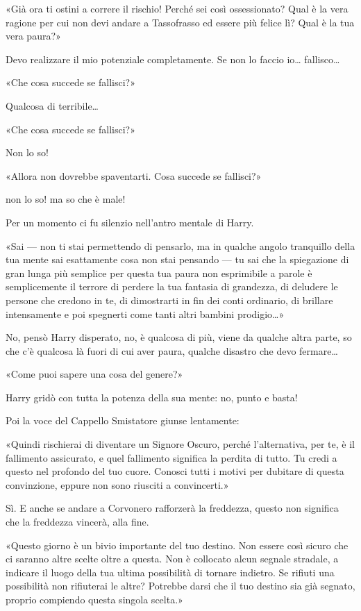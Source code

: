 «Già ora ti ostini a correre il rischio! Perché sei così ossessionato? Qual è la vera ragione per cui non devi andare a Tassofrasso ed essere più felice lì? Qual è la tua vera paura?»

Devo realizzare il mio potenziale completamente. Se non lo faccio io… fallisco…

«Che cosa succede se fallisci?»

Qualcosa di terribile…

«Che cosa succede se fallisci?»

Non lo so!

«Allora non dovrebbe spaventarti. Cosa succede se fallisci?»

non lo so! ma so che è male!

Per un momento ci fu silenzio nell’antro mentale di Harry.

«Sai — non ti stai permettendo di pensarlo, ma in qualche angolo tranquillo della tua mente sai esattamente cosa non stai pensando — tu sai che la spiegazione di gran lunga più semplice per questa tua paura non esprimibile a parole è semplicemente il terrore di perdere la tua fantasia di grandezza, di deludere le persone che credono in te, di dimostrarti in fin dei conti ordinario, di brillare intensamente e poi spegnerti come tanti altri bambini prodigio…»

No, pensò Harry disperato, no, è qualcosa di più, viene da qualche altra parte, so che c’è qualcosa là fuori di cui aver paura, qualche disastro che devo fermare…

«Come puoi sapere una cosa del genere?»

Harry gridò con tutta la potenza della sua mente: no, punto e basta!

Poi la voce del Cappello Smistatore giunse lentamente:

«Quindi rischierai di diventare un Signore Oscuro, perché l’alternativa, per te, è il fallimento assicurato, e quel fallimento significa la perdita di tutto. Tu credi a questo nel profondo del tuo cuore. Conosci tutti i motivi per dubitare di questa convinzione, eppure non sono riusciti a convincerti.»

Sì. E anche se andare a Corvonero rafforzerà la freddezza, questo non significa che la freddezza vincerà, alla fine.

«Questo giorno è un bivio importante del tuo destino. Non essere così sicuro che ci saranno altre scelte oltre a questa. Non è collocato alcun segnale stradale, a indicare il luogo della tua ultima possibilità di tornare indietro. Se rifiuti una possibilità non rifiuterai le altre? Potrebbe darsi che il tuo destino sia già segnato, proprio compiendo questa singola scelta.»

